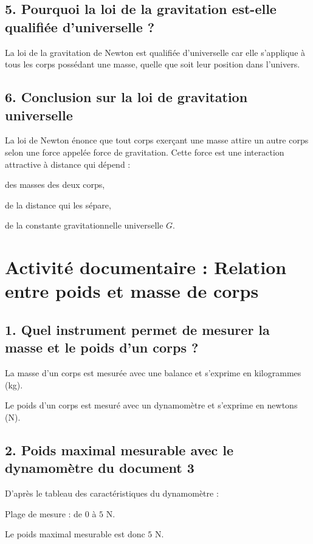 \documentclass[a4paper,12pt]{article}
\begin{document}
\subsection*{5. Pourquoi la loi de la gravitation est-elle qualifiée d’universelle ?}
La loi de la gravitation de Newton est qualifiée d’universelle car elle s’applique à tous les corps possédant une masse, quelle que soit leur position dans l’univers.

\subsection*{6. Conclusion sur la loi de gravitation universelle}
La loi de Newton énonce que tout corps exerçant une masse attire un autre corps selon une force appelée force de gravitation. Cette force est une interaction attractive à distance qui dépend :
\begin{compactenum}
    \item des masses des deux corps,
    \item de la distance qui les sépare,
    \item de la constante gravitationnelle universelle $G$.
\end{compactenum}

\section*{Activité documentaire : Relation entre poids et masse de corps}

\subsection*{1. Quel instrument permet de mesurer la masse et le poids d'un corps ?}
\begin{compactenum}
    \item La masse d'un corps est mesurée avec une balance et s'exprime en kilogrammes (kg).
    \item Le poids d'un corps est mesuré avec un dynamomètre et s'exprime en newtons (N).
\end{compactenum}

\subsection*{2. Poids maximal mesurable avec le dynamomètre du document 3}
D'après le tableau des caractéristiques du dynamomètre :
\begin{compactenum}
    \item Plage de mesure : de $0$ à $5$ N.
    \item Le poids maximal mesurable est donc $5$ N.
\end{compactenum}
\end{document}
